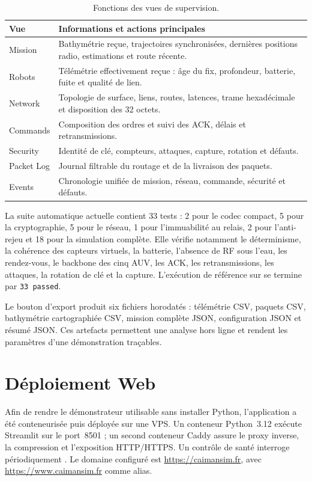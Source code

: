 \begin{table}[htbp]
  \centering
  \caption{Fonctions des vues de supervision.}
  \label{tab:sim-views}
  \begin{tabularx}{\textwidth}{@{}l X@{}}
    \toprule
    \textbf{Vue} & \textbf{Informations et actions principales} \\
    \midrule
    Mission & Bathymétrie reçue, trajectoires synchronisées, dernières positions radio, estimations et route récente. \\
    Robots & Télémétrie effectivement reçue : âge du fix, profondeur, batterie, fuite et qualité de lien. \\
    Network & Topologie de surface, liens, routes, latences, trame hexadécimale et disposition des 32 octets. \\
    Commands & Composition des ordres et suivi des ACK, délais et retransmissions. \\
    Security & Identité de clé, compteurs, attaques, capture, rotation et défauts. \\
    Packet Log & Journal filtrable du routage et de la livraison des paquets. \\
    Events & Chronologie unifiée de mission, réseau, commande, sécurité et défauts. \\
    \bottomrule
  \end{tabularx}
\end{table}

La suite automatique actuelle contient 33 tests : 2 pour le codec compact, 5 pour la cryptographie, 5 pour le réseau, 1 pour l'immuabilité au relais, 2 pour l'anti-rejeu et 18 pour la simulation complète. Elle vérifie notamment le déterminisme, la cohérence des capteurs virtuels, la batterie, l'absence de RF sous l'eau, les rendez-vous, le backbone des cinq AUV, les ACK, les retransmissions, les attaques, la rotation de clé et la capture. L'exécution de référence sur  se termine par \texttt{33 passed}.

Le bouton d'export produit six fichiers horodatés : télémétrie CSV, paquets CSV, bathymétrie cartographiée CSV, mission complète JSON, configuration JSON et résumé JSON. Ces artefacts permettent une analyse hors ligne et rendent les paramètres d'une démonstration traçables.

\section{Déploiement Web}

Afin de rendre le démonstrateur utilisable sans installer Python, l'application a été conteneurisée puis déployée sur une VPS. Un conteneur Python~3.12 exécute Streamlit sur le port~8501 ; un second conteneur Caddy assure le proxy inverse, la compression et l'exposition HTTP/HTTPS. Un contrôle de santé interroge périodiquement . Le domaine configuré est \url{https://caimansim.fr}, avec \url{https://www.caimansim.fr} comme alias.

